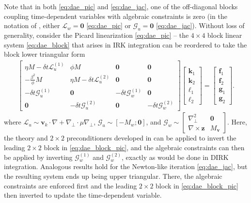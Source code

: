 \documentclass[review]{siamart}
\begin{document}
Note that in both \eqref{eq:dae_pic} and \eqref{eq:dae_jac}, one of the
off-diagonal blocks coupling time-dependent variables with algebraic
constraints is zero (in the notation of , either
$\mathcal{L}_{w}=\mathbf{0}$ \eqref{eq:dae_pic} or $\mathcal{G}_{u} = \mathbf{0}$
\eqref{eq:dae_jac}). Without loss of generality, consider the Picard
linearization \eqref{eq:dae_pic} -- the $4\times 4$ block linear system
\eqref{eq:dae_block} that arises in IRK integration can be reordered
to take the block lower triangular form
%
\begin{align}\label{eq:dae_block_pic}
\begin{bmatrix} \eta M - \delta t\mathcal{L}_{u}^{(1)} & \phi M & \mathbf{0} & \mathbf{0} \\
	-\tfrac{\beta^2}{\phi}M & \eta M - \delta t\mathcal{L}_{u}^{(2)} & \mathbf{0} & \mathbf{0} \\
	-\delta t\mathcal{G}_{u}^{(1)} & \mathbf{0} & -\delta t\mathcal{G}_w^{(1)} & \mathbf{0} \\
	\mathbf{0} & -\delta t\mathcal{G}_{u}^{(2)}  & \mathbf{0} &
		-\delta t\mathcal{G}_w^{(2)} \end{bmatrix}
	\begin{bmatrix} \mathbf{k}_1 \\ \mathbf{k}_2 \\
		\boldsymbol{\ell}_1 \\ \boldsymbol{\ell}_2 \end{bmatrix}
	= 	\begin{bmatrix} \mathbf{f}_1 \\ \mathbf{f}_2 \\
		 \mathbf{g}_1 \\ \mathbf{g}_2 \end{bmatrix}.
\end{align}
%
where $\mathcal{L}_{u}\sim \mathbf{v}_k\cdot\nabla + \nabla_\perp \cdot\mu\nabla_\perp$,
$\mathcal{G}_{u} \sim [-M_w;\mathbf{0}]$, and $\mathcal{G}_w\sim
\begin{bmatrix} \nabla_\perp^2 & \mathbf{0} \\ \nabla\times \mathbf{z} & M_{\mathbf{v}}
\end{bmatrix}$. Here, the theory and $2\times 2$ preconditioners developed in
 can be applied to invert the leading $2\times 2$ block in
\eqref{eq:dae_block_pic}, and the algebraic constraints can then be
applied by inverting $\mathcal{G}_w^{(1)}$ and $\mathcal{G}_w^{(2)}$,
exactly as would be done in DIRK integration. Analogous results hold
for the Newton-like iteration \eqref{eq:dae_jac}, but the resulting system
ends up being upper triangular. There, the algebraic constraints are
enforced first and the leading $2\times 2$ block in \eqref{eq:dae_block_pic}
then inverted to update the time-dependent variable.
\end{document}
